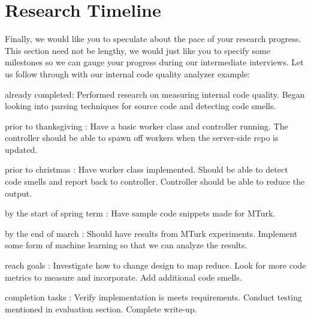 \documentclass{sig-alternate}
\begin{document}
\section{Research Timeline}
\label{sec:research_timeline}
Finally, we would like you to speculate about the pace of your
research progress. This section need not be lengthy, we would just
like you to specify some milestones so we can gauge your progress
during our intermediate interviews. Let us follow through with our
internal code quality analyzer example:
\begin{itemize*}
	\item {\sc already completed}: Performed research on measuring internal code quality. Began looking into parsing techniques for source code and detecting code smells.\vspace{3pt}
	\item {\sc prior to thanksgiving} : Have a basic worker class and controller running. The controller should be able to spawn off workers when the server-side repo is updated.\vspace{3pt}
	\item {\sc prior to christmas} : Have worker class implemented. Should be able to detect code smells and report back to controller. Controller should be able to reduce the output.\vspace{3pt}
\item {\sc by the start of spring term} : Have sample code snippets made for MTurk.\vspace{3pt}	
\item {\sc by the end of march} : Should have results from MTurk experiments. Implement some form of machine learning so that we can analyze the results.\vspace{3pt}
\item {\sc reach goals} : Investigate how to change design to map reduce. Look for more code metrics to measure and incorporate. Add additional code smells. \vspace{3pt}
\item {\sc completion tasks} : Verify implementation is meets requirements. Conduct testing mentioned in evaluation section. Complete write-up.\vspace{3pt}
\end{itemize*}


\vspace{175pt}
\end{document}
